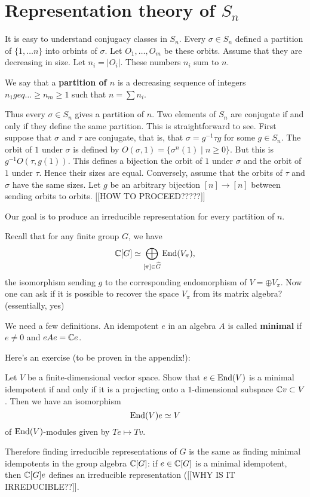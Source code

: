 \documentclass[11pt, english]{article}
\begin{document}
\newpage
\section{Representation theory of $S_n$}

It is easy to understand conjugacy classes in $S_n$. Every $\sigma \in S_n$ defined a partition of $\{ 1,\ldots n\}$ into orbints of $\sigma$. Let $O_1,\ldots,O_m$ be these orbits. Assume that they are decreasing in size. Let $n_i=\lvert O_i \rvert$. These numbers $n_i$ sum to $n$.

We say that a \textbf{partition of $n$} is a decreasing sequence of integers $n_1 geq \ldots \geq n_m \geq 1$ such that $n=\sum n_i$. 

Thus every $\sigma \in S_n$ gives a partition of $n$. Two elements of $S_n$ are conjugate if and only if they define the same partition. This is straightforward to see. First suppose that $\sigma$ and $\tau$ are conjugate, that is, that $\sigma = g^{-1} \tau g$ for some $g \in S_n$. The orbit of $1$ under $\sigma$ is defined by $O(\sigma,1) = \{ \sigma^n(1) \mid n \geq 0 \}$. But this is $g^{-1} O(\tau, g(1))$. This defines a bijection the orbit of $1$ under $\sigma$ and the orbit of $1$ under $\tau$. Hence their sizes are equal. Conversely, assume that the orbits of $\tau$ and $\sigma$ have the same sizes. Let $g$ be an arbitrary bijection $[n] \to [n]$ between sending orbits to orbits. [[HOW TO PROCEED?????]]

Our goal is to produce an irreducible representation for every partition of $n$.

Recall that for any finite group $G$, we have
$$
\mathbb{C} [G] \simeq \bigoplus_{[\pi] \in \widehat G} \operatorname{End}(V_\pi),
$$
the isomorphism sending $g$ to the corresponding endomorphism of $V = \oplus V_\pi$. Now one can ask if it is possible to recover the space $V_\pi$ from its matrix algebra? (essentially, yes)

We need a few definitions. An idempotent $e$ in an algebra $A$ is called \textbf{minimal} if $e \neq 0$ and $eAe =\mathbb{C} e$. 

Here's an exercise (to be proven in the appendix!):
\begin{exc}
 Let $V$ be a finite-dimensional vector space. Show that $e \in \operatorname{End}(V)$ is a minimal idempotent if and only if it is a projecting onto a $1$-dimensional subspace $\mathbb{C} v \subset V$. Then we have an isomorphism
$$
\operatorname{End}(V)e \simeq V
$$
of $\operatorname{End}(V)$-modules given by $Te \mapsto Tv$. 
\end{exc}
Therefore finding irreducible representations of $G$ is the same as finding minimal idempotents in the group algebra $\mathbb{C}[G]$: if $e \in \mathbb{C}[G]$ is a minimal idempotent, then $\mathbb{C}[G]e$ defines an irreducible representation ([[WHY IS IT IRREDUCIBLE??]].
\end{document}
